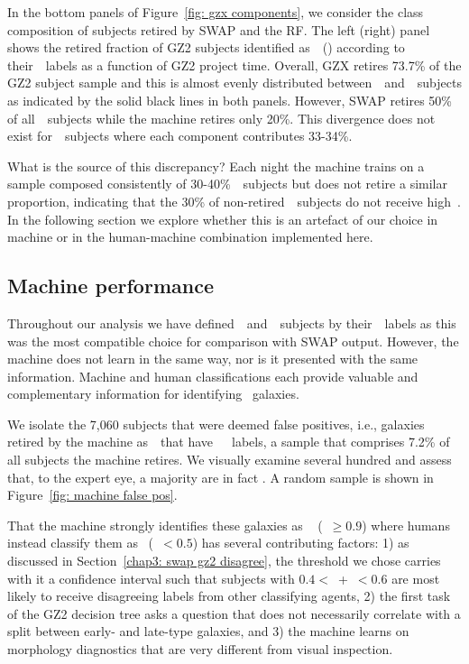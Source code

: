 In the bottom panels of Figure~\ref{fig: gzx components}, we consider the class
composition of subjects retired by SWAP and the RF. The left (right) panel shows the retired fraction of GZ2 subjects identified as~\feat~(\notfeat) according to their~\raw~labels as a function of GZ2 project time. Overall, GZX retires 73.7\% of the GZ2 subject sample and this is almost evenly distributed between~\feat~and~\notfeat~subjects as indicated by the solid black lines in both panels. However, SWAP retires 50\% of all~\feat~subjects while the machine retires only 20\%. This divergence does not exist for~\notfeat~subjects where each component contributes 33-34\%. 

What is the source of this discrepancy? Each night the machine trains on a sample composed consistently of 30-40\%~\feat~subjects but does not retire a similar proportion, indicating that the 30\% of non-retired~\feat~subjects do not receive high~\pmachine. In the following section we explore whether this is an artefact of our choice in machine or in the human-machine combination implemented here. 


\subsection{Machine performance}\label{chap4: machine performance}

Throughout our analysis we have defined~\feat~and~\notfeat~subjects by 
their~\raw~labels as this was the most compatible choice for comparison with SWAP output. However, the machine does not learn in the same way, nor is it presented with the same information. Machine and human classifications each provide valuable and complementary information for identifying \feat~galaxies.

We isolate the 7,060 subjects that were deemed false positives, i.e., galaxies 
retired by the machine as~\feat~that have~\notfeat~\raw~labels, a sample that
comprises 7.2\% of all subjects the machine retires. We visually examine several hundred and assess that, to the expert eye, a majority are in fact \feat. A random sample is shown in Figure~\ref{fig: machine false pos}. 


That the machine strongly identifies these galaxies as \feat~
(\pmachine~$\ge 0.9$) where humans instead classify them as \notfeat~(\ffeat~$< 0.5$) has several contributing factors: 1) as discussed in Section~\ref{chap3: swap gz2 disagree}, the threshold we chose carries with it a confidence interval such that subjects with $0.4 <$~\ffeat+\fstar~$< 0.6$ are most likely to receive disagreeing labels from other classifying agents, 2) the first task of the GZ2 decision tree asks a question that does not necessarily correlate with a split between early- and
 late-type galaxies, and 3) the machine learns on morphology diagnostics
 that are very different from visual inspection.

